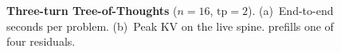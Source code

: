 \begin{figure}[t]
\centering
\resizebox{\columnwidth}{!}{}
\caption{\textbf{Three-turn Tree-of-Thoughts} ($n{=}16$, $\mathrm{tp}{=}2$).
(a)~End-to-end seconds per problem.
(b)~Peak KV on the live spine.
\plus{} prefills one of four residuals.}
\label{fig:eval-mt}
\end{figure}
